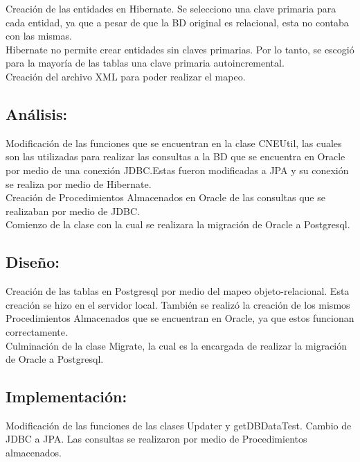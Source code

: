 \documentclass[12pt,oneside]{book}
\begin{document}
	Creación de las entidades en Hibernate. Se selecciono una clave primaria para cada entidad, ya que a pesar de que la BD original es relacional, esta no contaba con las mismas. \\
	
	Hibernate no permite crear entidades sin claves primarias. Por lo tanto, se escogió para la mayoría de las tablas una clave primaria autoincremental.\\
	
	Creación del archivo XML para poder realizar el mapeo. 
	
	
	\subsection{Análisis:}
	Modificación de las funciones que se encuentran en la clase CNEUtil, las cuales son las utilizadas para realizar las consultas a la BD que se encuentra en Oracle por medio de una conexión JDBC.Estas fueron modificadas a JPA y su conexión se realiza por medio de Hibernate.\\

	Creación de Procedimientos Almacenados en Oracle de las consultas que se realizaban por medio de JDBC. \\
	
	Comienzo de la clase con la cual se realizara la migración de Oracle a Postgresql.
	
	\subsection{Diseño:}
	
	Creación de las tablas en Postgresql por medio del mapeo objeto-relacional. Esta creación se hizo en el servidor local. También se realizó la creación de los mismos Procedimientos Almacenados que se encuentran en Oracle, ya que estos funcionan correctamente.\\  
	
	Culminación de la clase Migrate, la cual es la encargada de realizar la migración de Oracle a Postgresql.
	
	\subsection{Implementación:}
	
	Modificación de las funciones de las clases Updater y getDBDataTest. Cambio de JDBC a JPA. Las consultas se realizaron por medio de Procedimientos almacenados.\\
	
\end{document}
